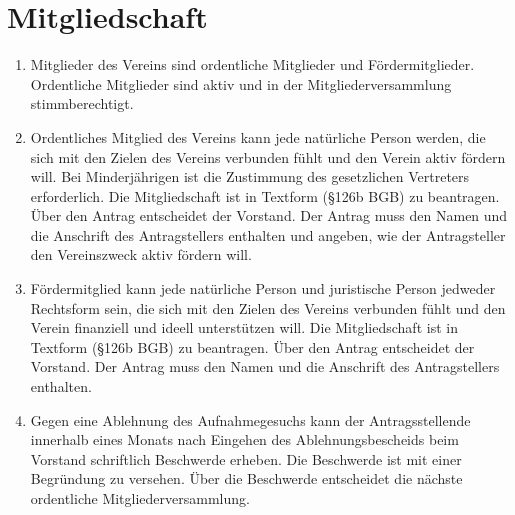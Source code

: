 \documentclass[ngerman]{article}
\begin{document}
\section{Mitgliedschaft}
\begin{enumerate}
  \item Mitglieder des Vereins sind ordentliche Mitglieder und Fördermitglieder. Ordentliche Mitglieder sind aktiv und  in der Mitgliederversammlung stimmberechtigt.  
  \item Ordentliches Mitglied des Vereins kann jede natürliche Person werden, die sich mit den Zielen des Vereins verbunden fühlt und den Verein aktiv fördern will.
  Bei Minderjährigen ist die Zustimmung des gesetzlichen Vertreters erforderlich.
  Die Mitgliedschaft ist in Textform (§126b BGB) zu beantragen.
  Über den Antrag entscheidet der Vorstand.
  Der Antrag muss den Namen und die Anschrift des Antragstellers enthalten  und  angeben, wie der Antragsteller den Vereinszweck aktiv fördern will.
  \item Fördermitglied kann jede natürliche Person und juristische Person jedweder Rechtsform sein, die sich mit den Zielen des Vereins verbunden fühlt und den Verein finanziell und ideell unterstützen will.
  Die Mitgliedschaft ist in Textform (§126b BGB) zu beantragen.
  Über den Antrag entscheidet der Vorstand.
  Der Antrag muss den Namen und die Anschrift des Antragstellers enthalten.
  \item Gegen eine Ablehnung des Aufnahmegesuchs kann der Antragsstellende innerhalb eines Monats nach Eingehen des Ablehnungsbescheids beim Vorstand schriftlich Beschwerde erheben.
  Die Beschwerde ist mit einer Begründung zu versehen.
  Über die Beschwerde entscheidet die nächste ordentliche Mitgliederversammlung.
\end{enumerate}
\end{document}

